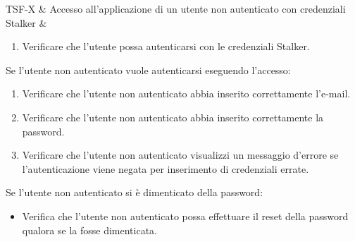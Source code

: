 

TSF-X & Accesso all'applicazione di un utente non autenticato con credenziali Stalker & \begin{enumerate}
    \item Verificare che l'utente possa autenticarsi con le credenziali Stalker.
\end{enumerate}
Se l'utente non autenticato vuole autenticarsi eseguendo l'accesso:
\begin{enumerate}
    \item Verificare che l'utente non autenticato abbia inserito correttamente l'e-mail.
    \item Verificare che l'utente non autenticato abbia inserito correttamente la password.
    \item Verificare che l'utente non autenticato visualizzi un messaggio d'errore se l'autenticazione viene negata per inserimento di credenziali errate.
\end{enumerate}
Se l'utente non autenticato si è dimenticato della password:
\begin{itemize}
    \item Verifica che l'utente non autenticato possa effettuare il reset della password qualora se la fosse dimenticata.
\end{itemize} \\

